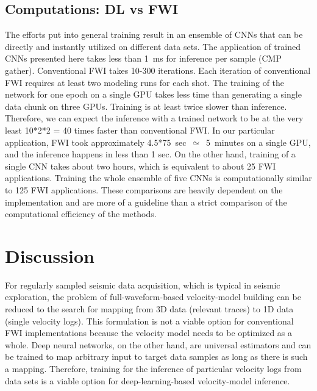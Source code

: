 \documentclass[paper,twocolomn]{geophysics}
\begin{document}


\subsection{Computations: DL vs FWI}

The efforts put into general training result in an ensemble of CNNs that can be directly and instantly utilized on different data sets. The application of trained CNNs presented here takes less than 1~ms for inference per sample (CMP gather). Conventional FWI takes 10-300 iterations. Each iteration of conventional FWI requires at least two modeling runs for each shot. The training of the network for one epoch on a single GPU takes less time than generating a single data chunk on three GPUs. Training is at least twice slower than inference. Therefore, we can expect the inference with a trained network to be at the very least 10*2*2 = 40 times faster than conventional FWI. In our particular application, FWI took approximately 4.5*75~sec~$\simeq$~5~minutes on a single GPU, and the inference happens in less than 1 sec. On the other hand, training of a single CNN takes about two hours, which is equivalent to about 25 FWI applications. Training the whole ensemble of five CNNs is computationally similar to 125 FWI applications. These comparisons are heavily dependent on the implementation and are more of a guideline than a strict comparison of the computational efficiency of the methods.

\section{Discussion}

For regularly sampled seismic data acquisition, which is typical in seismic exploration, the problem of full-waveform-based velocity-model building can be reduced to the search for mapping from 3D data (relevant traces) to 1D data (single velocity logs). This formulation is not a viable option for conventional FWI implementations because the velocity model needs to be optimized as a whole. Deep neural networks, on the other hand, are universal estimators and can be trained to map arbitrary input to target data samples as long as there is such a mapping. Therefore, training for the inference of particular velocity logs from data sets is a viable option for deep-learning-based velocity-model inference.
\end{document}

